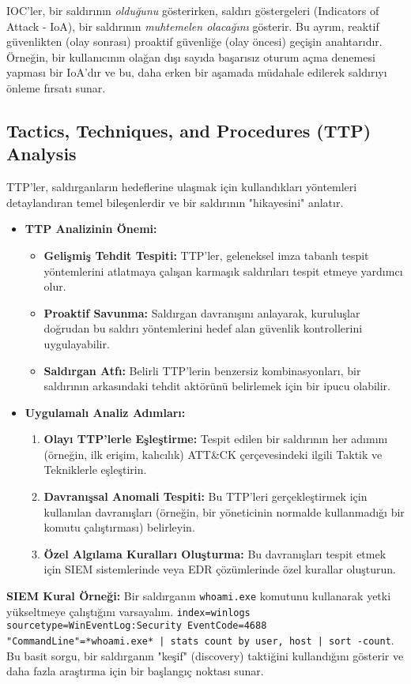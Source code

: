 IOC'ler, bir saldırının \textit{olduğunu} gösterirken, saldırı göstergeleri (Indicators of Attack - IoA), bir saldırının \textit{muhtemelen olacağını} gösterir. Bu ayrım, reaktif güvenlikten (olay sonrası) proaktif güvenliğe (olay öncesi) geçişin anahtarıdır. Örneğin, bir kullanıcının olağan dışı sayıda başarısız oturum açma denemesi yapması bir IoA'dır ve bu, daha erken bir aşamada müdahale edilerek saldırıyı önleme fırsatı sunar.

\subsection{Tactics, Techniques, and Procedures (TTP) Analysis}

TTP'ler, saldırganların hedeflerine ulaşmak için kullandıkları yöntemleri detaylandıran temel bileşenlerdir ve bir saldırının "hikayesini" anlatır.

\begin{itemize}
    \item \textbf{TTP Analizinin Önemi:}
    \begin{itemize}
        \item \textbf{Gelişmiş Tehdit Tespiti:} TTP'ler, geleneksel imza tabanlı tespit yöntemlerini atlatmaya çalışan karmaşık saldırıları tespit etmeye yardımcı olur.
        \item \textbf{Proaktif Savunma:} Saldırgan davranışını anlayarak, kuruluşlar doğrudan bu saldırı yöntemlerini hedef alan güvenlik kontrollerini uygulayabilir.
        \item \textbf{Saldırgan Atfı:} Belirli TTP'lerin benzersiz kombinasyonları, bir saldırının arkasındaki tehdit aktörünü belirlemek için bir ipucu olabilir.
    \end{itemize}
    \item \textbf{Uygulamalı Analiz Adımları:}
    \begin{enumerate}
        \item \textbf{Olayı TTP'lerle Eşleştirme:} Tespit edilen bir saldırının her adımını (örneğin, ilk erişim, kalıcılık) ATT\&CK çerçevesindeki ilgili Taktik ve Tekniklerle eşleştirin.
        \item \textbf{Davranışsal Anomali Tespiti:} Bu TTP'leri gerçekleştirmek için kullanılan davranışları (örneğin, bir yöneticinin normalde kullanmadığı bir komutu çalıştırması) belirleyin.
        \item \textbf{Özel Algılama Kuralları Oluşturma:} Bu davranışları tespit etmek için SIEM sistemlerinde veya EDR çözümlerinde özel kurallar oluşturun.
    \end{enumerate}
\end{itemize}
\textbf{SIEM Kural Örneği:} Bir saldırganın \texttt{whoami.exe} komutunu kullanarak yetki yükseltmeye çalıştığını varsayalım. \texttt{index=winlogs sourcetype=WinEventLog:Security EventCode=4688 "CommandLine"=*whoami.exe* | stats count by user, host | sort -count}. Bu basit sorgu, bir saldırganın "keşif" (discovery) taktiğini kullandığını gösterir ve daha fazla araştırma için bir başlangıç noktası sunar.

